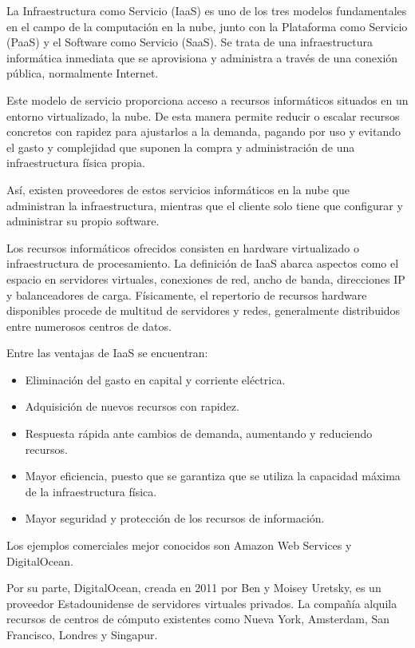 La Infraestructura como Servicio (IaaS) es uno de los tres modelos fundamentales en el campo de la computación en la nube, junto con la Plataforma como Servicio (PaaS) y el Software como Servicio (SaaS). Se trata de una infraestructura informática inmediata que se aprovisiona y administra a través de una conexión pública, normalmente Internet.

Este modelo de servicio proporciona acceso a recursos informáticos situados en un entorno virtualizado, la nube. De esta manera permite reducir o escalar recursos  concretos con rapidez para ajustarlos a la demanda, pagando por uso y evitando el gasto y complejidad que suponen la compra y administración de una infraestructura física propia.

Así, existen proveedores de estos servicios informáticos en la nube que administran la infraestructura, mientras que el cliente solo tiene que configurar y administrar su propio software.

Los recursos informáticos ofrecidos consisten en hardware virtualizado o infraestructura de procesamiento. La definición de IaaS abarca aspectos como el espacio en servidores virtuales, conexiones de red, ancho de banda, direcciones IP y balanceadores de carga. Físicamente, el repertorio de recursos hardware disponibles procede de multitud de servidores y redes, generalmente distribuidos entre numerosos centros de datos.

Entre las ventajas de IaaS se encuentran:
\begin{itemize}
\item Eliminación del gasto en capital y corriente eléctrica.
\item Adquisición de nuevos recursos con rapidez.
\item Respuesta rápida ante cambios de demanda, aumentando y reduciendo recursos.
\item Mayor eficiencia, puesto que se garantiza que se utiliza la capacidad máxima de la infraestructura física.
\item Mayor seguridad y protección de los recursos de información.
\end{itemize}

Los ejemplos comerciales mejor conocidos son Amazon Web Services y DigitalOcean.

Por su parte, DigitalOcean, creada en 2011 por Ben y Moisey Uretsky, es un proveedor Estadounidense de servidores virtuales privados. La compañía alquila recursos de centros de cómputo existentes como Nueva York, Amsterdam, San Francisco, Londres y Singapur.

